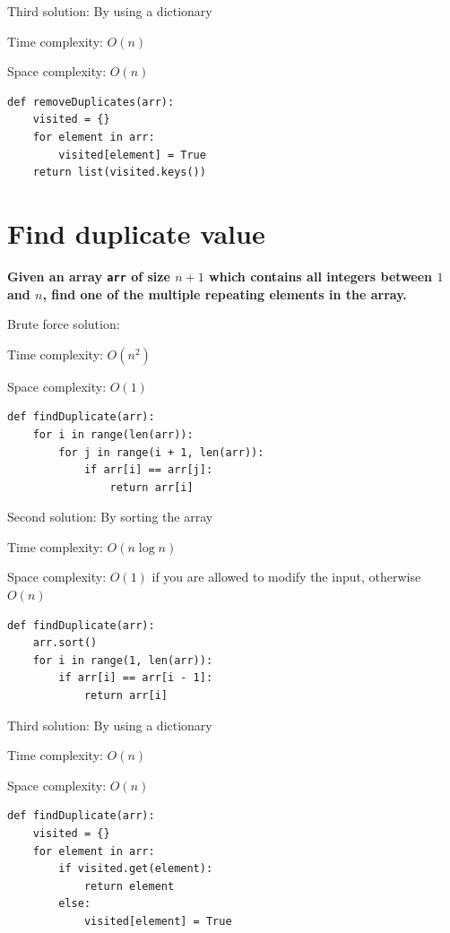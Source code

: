 \documentclass[a4paper,11pt]{book}
\begin{document}
\noindent Third solution: By using a dictionary

\noindent Time complexity: $O(n)$

\noindent Space complexity: $O(n)$

\begin{lstlisting}
def removeDuplicates(arr):
    visited = {}
    for element in arr:
        visited[element] = True
    return list(visited.keys())
\end{lstlisting}

\newpage
\section{Find duplicate value}

\textbf{Given an array \lstinline{arr} of size $n + 1$ which contains all integers between $1$ and $n$, find one of the multiple repeating elements in the array. }
\vspace{5mm}

\noindent Brute force solution:

\noindent Time complexity: $O(n^2)$

\noindent Space complexity: $O(1)$

\begin{lstlisting}
def findDuplicate(arr):
    for i in range(len(arr)):
        for j in range(i + 1, len(arr)):
            if arr[i] == arr[j]:
                return arr[i]
\end{lstlisting}

\noindent Second solution: By sorting the array

\noindent Time complexity: $O(n\log n)$

\noindent Space complexity: $O(1)$ if you are allowed to modify the input, otherwise $O(n)$

\begin{lstlisting}
def findDuplicate(arr):
    arr.sort()
    for i in range(1, len(arr)):
        if arr[i] == arr[i - 1]:
            return arr[i]
\end{lstlisting}

\noindent Third solution: By using a dictionary

\noindent Time complexity: $O(n)$

\noindent Space complexity: $O(n)$

\begin{lstlisting}
def findDuplicate(arr):
    visited = {}
    for element in arr:
        if visited.get(element):
            return element
        else:
            visited[element] = True
\end{lstlisting}
\end{document}
